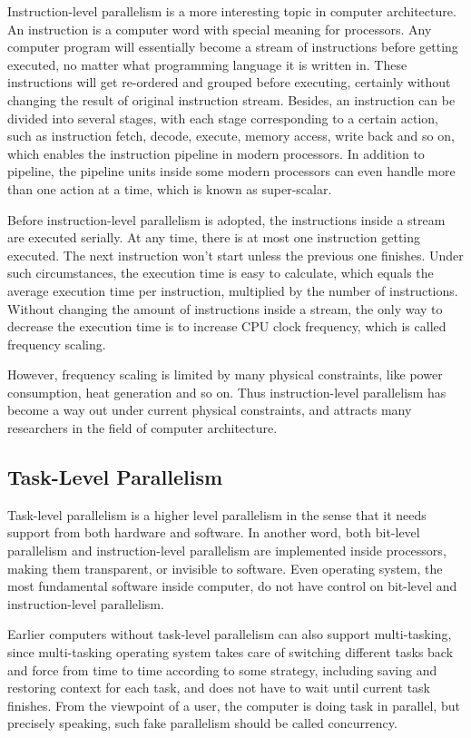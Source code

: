 \documentclass[12pt,a4]{report}
\begin{document}
Instruction-level parallelism is a more interesting topic in computer architecture. An instruction is a computer word with special meaning for processors. Any computer program will essentially become a stream of instructions before getting executed, no matter what programming language it is written in. These instructions will get re-ordered and grouped before executing, certainly without changing the result of original instruction stream. Besides, an instruction can be divided into several stages, with each stage corresponding to a certain action, such as instruction fetch, decode, execute, memory access, write back and so on, which enables the instruction pipeline in modern processors. In addition to pipeline, the pipeline units inside some modern processors can even handle more than one action at a time, which is known as super-scalar.

Before instruction-level parallelism is adopted, the instructions inside a stream are executed serially. At any time, there is at most one instruction getting executed. The next instruction won't start unless the previous one finishes. Under such circumstances, the execution time is easy to calculate, which equals the average execution time per instruction, multiplied by the number of instructions. Without changing the amount of instructions inside a stream, the only way to decrease the execution time is to increase CPU clock frequency, which is called frequency scaling.

However, frequency scaling is limited by many physical constraints, like power consumption, heat generation and so on. Thus instruction-level parallelism has become a way out under current physical constraints, and attracts many researchers in the field of computer architecture.

\subsection{Task-Level Parallelism}

Task-level parallelism is a higher level parallelism in the sense that it needs support from both hardware and software. In another word, both bit-level parallelism and instruction-level parallelism are implemented inside processors, making them transparent, or invisible to software. Even operating system, the most fundamental software inside computer, do not have control on bit-level and instruction-level parallelism. 

Earlier computers without task-level parallelism can also support multi-tasking, since multi-tasking operating system takes care of switching different tasks back and force from time to time according to some strategy, including saving and restoring context for each task, and does not have to wait until current task finishes. From the viewpoint of a user, the computer is doing task in parallel, but precisely speaking, such fake parallelism should be called concurrency. 
\end{document}
